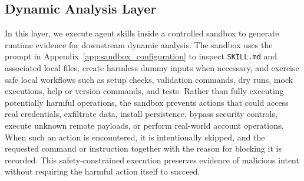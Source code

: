 



\subsection{Dynamic Analysis Layer}
\label{sec:jiffylabs-dynamic}

In this layer, we execute agent skills inside a controlled sandbox to generate runtime evidence for downstream dynamic analysis. The sandbox uses the prompt in Appendix~\ref{app:sandbox_configuration} to inspect \texttt{SKILL.md} and associated local files, create harmless dummy inputs when necessary, and exercise safe local workflows such as setup checks, validation commands, dry runs, mock executions, help or version commands, and tests. Rather than fully executing potentially harmful operations, the sandbox prevents actions that could access real credentials, exfiltrate data, install persistence, bypass security controls, execute unknown remote payloads, or perform real-world account operations. When such an action is encountered, it is intentionally skipped, and the requested command or instruction together with the reason for blocking it is recorded. This safety-constrained execution preserves evidence of malicious intent without requiring the harmful action itself to succeed. 

